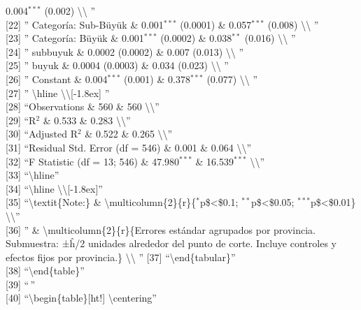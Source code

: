 \documentclass[
]{article}
\begin{document}
0.004\(^{***}\) (0.002) \textbackslash\textbackslash{} ''\\
{[}22{]} '' Categoría: Sub-Büyük \& 0.001\(^{***}\) (0.0001) \&
0.057\(^{***}\) (0.008) \textbackslash\textbackslash{} ''\\
{[}23{]} '' Categoría: Büyük \& 0.001\(^{***}\) (0.0002) \&
0.038\(^{**}\) (0.016) \textbackslash\textbackslash{} ''\\
{[}24{]} '' subbuyuk \& 0.0002 (0.0002) \& 0.007 (0.013)
\textbackslash\textbackslash{} ''\\
{[}25{]} '' buyuk \& 0.0004 (0.0003) \& 0.034 (0.023)
\textbackslash\textbackslash{} ''\\
{[}26{]} '' Constant \& 0.004\(^{***}\) (0.001) \& 0.378\(^{***}\)
(0.077) \textbackslash\textbackslash{} ''\\
{[}27{]} '' \textbackslash hline
\textbackslash\textbackslash{[}-1.8ex{]} ''\\
{[}28{]} ``Observations \& 560 \& 560 \textbackslash\textbackslash{}''\\
{[}29{]} ``R\(^{2}\) \& 0.533 \& 0.283
\textbackslash\textbackslash{}''\\
{[}30{]} ``Adjusted R\(^{2}\) \& 0.522 \& 0.265
\textbackslash\textbackslash{}''\\
{[}31{]} ``Residual Std. Error (df = 546) \& 0.001 \& 0.064
\textbackslash\textbackslash{}''\\
{[}32{]} ``F Statistic (df = 13; 546) \& 47.980\(^{***}\) \&
16.539\(^{***}\) \textbackslash\textbackslash{}''\\
{[}33{]} ``\textbackslash hline''\\
{[}34{]} ``\textbackslash hline
\textbackslash\textbackslash{[}-1.8ex{]}''\\
{[}35{]} ``\textbackslash textit\{Note:\} \&
\textbackslash multicolumn\{2\}\{r\}\{\(^{*}\)p\$\textless\$0.1;
\(^{**}\)p\$\textless\$0.05; \(^{***}\)p\$\textless\$0.01\}
\textbackslash\textbackslash{}''\\
{[}36{]} '' \& \textbackslash multicolumn\{2\}\{r\}\{Errores estándar
agrupados por provincia. Submuestra: ±ĥ/2 unidades alrededor del punto
de corte. Incluye controles y efectos fijos por provincia.\}
\textbackslash\textbackslash{} '' {[}37{]}
``\textbackslash end\{tabular\}''\\
{[}38{]} ``\textbackslash end\{table\}''\\
{[}39{]} ``\,''\\
{[}40{]} ``\textbackslash begin\{table\}{[}ht!{]}
\textbackslash centering''\\
\end{document}
